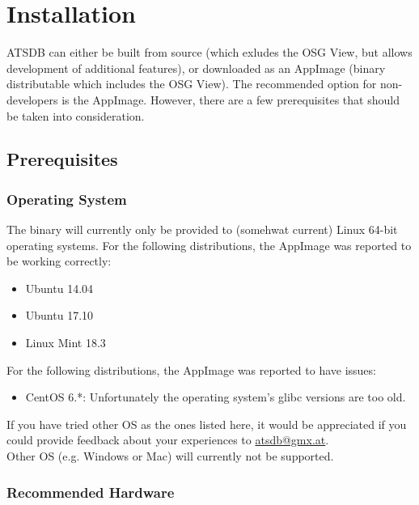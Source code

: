 \chapter{Installation}
\label{sec:installation}

ATSDB can either be built from source (which exludes the OSG View, but allows development of additional features), or downloaded as an AppImage (binary distributable which includes the OSG View). The recommended option for non-developers is the AppImage. However, there are a few prerequisites that should be taken into consideration.

\section{Prerequisites}

\subsection{Operating System}

The binary will currently only be provided to (somehwat current) Linux 64-bit operating systems. For the following distributions, the AppImage was reported to be working correctly:

\begin{itemize}  
\item Ubuntu 14.04
\item Ubuntu 17.10
\item Linux Mint 18.3
\end{itemize}

For the following distributions, the AppImage was reported to have issues:

\begin{itemize}  
\item CentOS 6.*: Unfortunately the operating system's glibc versions are too old.
\end{itemize}

If you have tried other OS as the ones listed here, it would be appreciated if you could provide feedback about your experiences to \href{mailto:atsdb@gmx.at}{atsdb@gmx.at}.\\

Other OS (e.g. Windows or Mac) will currently not be supported.

\subsection{Recommended Hardware}

